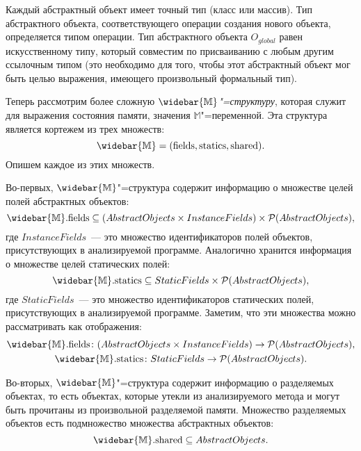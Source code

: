 \documentclass[14pt,titlepage,draft]{extarticle}
\newcommand{\M}{\ensuremath{\mathbb{M}}}
\newcommand{\Ms}{\ensuremath{\mathbb{\widebar{M}}}}
\newcommand{\Mfield}[1]{\ensuremath{\mathrm{#1}}}
\newcommand{\AO}[1]{O_{#1}}
\newcommand{\AOGlobal}{\AO{global}}
\begin{document}
    Каждый абстрактный объект имеет точный тип (класс или массив). Тип
    абстрактного объекта, соответствующего операции создания нового объекта,
    определяется типом операции. Тип абстрактного объекта $\AOGlobal$ равен
    искусственному типу, который совместим по присваиванию с любым другим
    ссылочным типом (это необходимо для того, чтобы этот абстрактный объект мог
    быть целью выражения, имеющего произвольный формальный тип).

    Теперь рассмотрим более сложную \emph{\Ms"=структуру}, которая служит для
    выражения состояния памяти, значения \M"=переменной.
    Эта структура является кортежем из трех множеств:
    \[ \Ms = (\Mfield{fields}, \Mfield{statics}, \Mfield{shared}). \]
    Опишем каждое из этих множеств.

    Во-первых, \Ms"=структура содержит информацию о множестве целей полей
    абстрактных объектов:
    \[
      \Ms.\Mfield{fields} \subseteq
        (AbstractObjects \times InstanceFields) \times
        \powerset{AbstractObjects},
    \]
    где $InstanceFields$~--- это множество идентификаторов полей объектов,
    присутствующих в анализируемой программе.
    Аналогично хранится информация о множестве целей статических полей:
    \[
      \Ms.\Mfield{statics} \subseteq
        StaticFields \times \powerset{AbstractObjects},
    \]
    где $StaticFields$~--- это множество идентификаторов статических полей,
    присутствующих в анализируемой программе.
    Заметим, что эти множества можно рассматривать как
    отображения:
    \begin{gather*}
      \Ms.\Mfield{fields} \colon
        (AbstractObjects \times InstanceFields) \to
        \powerset{AbstractObjects}, \\
      \Ms.\Mfield{statics} \colon
        StaticFields \to \powerset{AbstractObjects}.
    \end{gather*}

    Во-вторых, \Ms"=структура содержит информацию о разделяемых объектах,
    то есть объектах, которые утекли  из анализируемого метода
    и могут быть прочитаны из произвольной разделяемой памяти. Множество
    разделяемых объектов есть подмножество множества абстрактных объектов:
    \[ \Ms.\Mfield{shared} \subseteq AbstractObjects. \]
\end{document}
